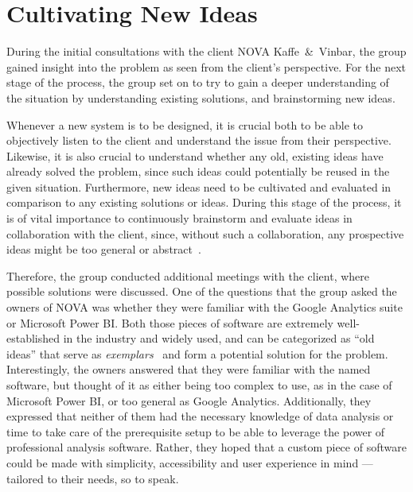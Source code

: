 \section{Cultivating New Ideas}\label{sec:cultivating-new-ideas}

During the initial consultations with the client NOVA Kaffe~\&~Vinbar, the group gained insight into the problem as seen
from the client's perspective.
For the next stage of the process, the group set on to try to gain a deeper understanding of the situation by
understanding existing solutions, and brainstorming new ideas.

Whenever a new system is to be designed, it is crucial both to be able to objectively listen to the client and
understand the issue from their perspective.
Likewise, it is also crucial to understand whether any old, existing ideas have already solved the problem, since such
ideas could potentially be reused in the given situation.
Furthermore, new ideas need to be cultivated and evaluated in comparison to any existing solutions or ideas.
During this stage of the process, it is of vital importance to continuously brainstorm and evaluate ideas in
collaboration with the client, since, without such a collaboration, any prospective ideas might be too general or
abstract~\cite[32]{mathiassen2018}.

Therefore, the group conducted additional meetings with the client, where possible solutions were discussed.
One of the questions that the group asked the owners of NOVA was whether they were familiar with the Google Analytics
suite or Microsoft Power BI\@.
Both those pieces of software are extremely well-established in the industry and widely used, and can be categorized as
``old ideas'' that serve as \textit{exemplars}~\cite[33]{mathiassen2018} and form a potential solution for the problem.
Interestingly, the owners answered that they were familiar with the named software, but thought of it as either being
too complex to use, as in the case of Microsoft Power BI, or too general as Google Analytics.
Additionally, they expressed that neither of them had the necessary knowledge of data analysis or time to take care of
the prerequisite setup to be able to leverage the power of professional analysis software.
Rather, they hoped that a custom piece of software could be made with simplicity, accessibility and user experience in
mind — tailored to their needs, so to speak.

